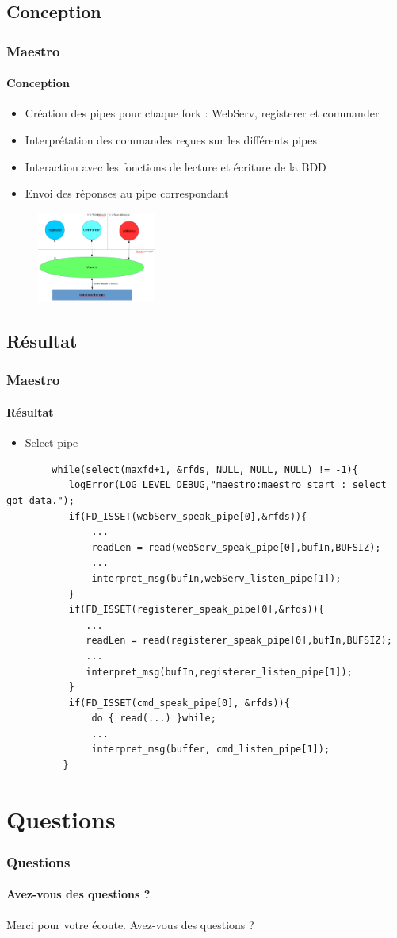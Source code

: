 \subsection{Conception}
\begin{frame}
	\frametitle{Maestro}
	\framesubtitle{Conception}
	\begin{itemize}
		\item Création des pipes pour chaque fork : WebServ, registerer et commander
		\item Interprétation des commandes reçues sur les différents pipes
		\item Interaction avec les fonctions de lecture et écriture de la BDD
		\item Envoi des réponses au pipe correspondant
	\end{itemize}
	\begin{figure}
	    \includegraphics[height=3cm, keepaspectratio=true]{../rapport_octopus/img/algo_brain_full.png}
	\end{figure}
\end{frame}

\subsection{Résultat}
\begin{frame}[fragile]
	\frametitle{Maestro}
	\framesubtitle{Résultat}
	\begin{itemize}
		\item Select pipe
	\end{itemize}
	\begin{verbatim}
		while(select(maxfd+1, &rfds, NULL, NULL, NULL) != -1){
		   logError(LOG_LEVEL_DEBUG,"maestro:maestro_start : select got data.");
		   if(FD_ISSET(webServ_speak_pipe[0],&rfds)){
		       ...
		       readLen = read(webServ_speak_pipe[0],bufIn,BUFSIZ);
		       ...
		       interpret_msg(bufIn,webServ_listen_pipe[1]);
		   }
		   if(FD_ISSET(registerer_speak_pipe[0],&rfds)){
		      ...
		      readLen = read(registerer_speak_pipe[0],bufIn,BUFSIZ);
		      ...
		      interpret_msg(bufIn,registerer_listen_pipe[1]);
		   }
		   if(FD_ISSET(cmd_speak_pipe[0], &rfds)){
		       do { read(...) }while;
		       ...
		       interpret_msg(buffer, cmd_listen_pipe[1]);
		  }

	\end{verbatim} 

\end{frame}

\section{Questions}
\begin{frame}
	\frametitle{Questions}
	\framesubtitle{Avez-vous des questions ?}
	Merci pour votre écoute.
	\newline
	Avez-vous des questions ?
\end{frame}

